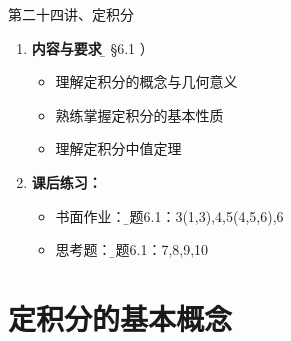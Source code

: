 \begin{frame}{第二十四讲、定积分}
	\linespread{1.5}
	\begin{enumerate}
	  \item {\bf 内容与要求}{\b（ \S 6.1 ）}
	  \begin{itemize}
	    \item 理解定积分的概念与几何意义
	    \item 熟练掌握定积分的基本性质
	    \item 理解定积分中值定理
	  \vspace{1em}
	  \end{itemize}
	  \item {\bf 课后练习：}
	  \begin{itemize}
	    \item 书面作业：{\b 习题6.1：3(1,3),4,5(4,5,6),6}
 	    \item 思考题：{\b 习题6.1：7,8,9,10}
	  \end{itemize}
	\end{enumerate}
\end{frame}

\section{定积分的基本概念}

